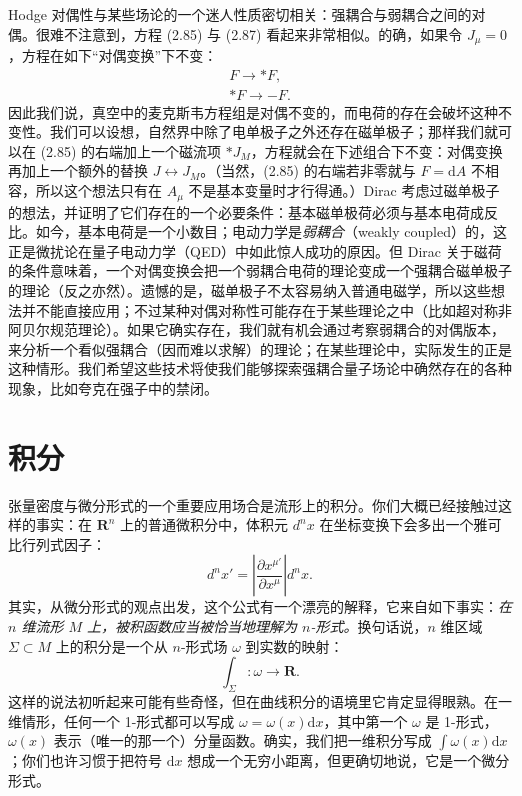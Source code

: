 Hodge 对偶性与某些场论的一个迷人性质密切相关：强耦合与弱耦合之间的对偶。很难不注意到，方程 (2.85) 与 (2.87) 看起来非常相似。的确，如果令 $J_{\mu}=0$，方程在如下“对偶变换”下不变：
\begin{gather*}
F\to *F,\\
*F\to -F. \tag{2.88}
\end{gather*}
因此我们说，真空中的麦克斯韦方程组是对偶不变的，而电荷的存在会破坏这种不变性。我们可以设想，自然界中除了电单极子之外还存在磁单极子；那样我们就可以在 (2.85) 的右端加上一个磁流项 $*J_{M}$，方程就会在下述组合下不变：对偶变换再加上一个额外的替换 $J\leftrightarrow J_{M}$。（当然，(2.85) 的右端若非零就与 $F=\mathrm{d}A$ 不相容，所以这个想法只有在 $A_{\mu}$ 不是基本变量时才行得通。）Dirac 考虑过磁单极子的想法，并证明了它们存在的一个必要条件：基本磁单极荷必须与基本电荷成反比。如今，基本电荷是一个小数目；电动力学是\emph{弱耦合}（weakly coupled）的，这正是微扰论在量子电动力学（QED）中如此惊人成功的原因。但 Dirac 关于磁荷的条件意味着，一个对偶变换会把一个弱耦合电荷的理论变成一个强耦合磁单极子的理论（反之亦然）。遗憾的是，磁单极子不太容易纳入普通电磁学，所以这些想法并不能直接应用；不过某种对偶对称性可能存在于某些理论之中（比如超对称非阿贝尔规范理论）。如果它确实存在，我们就有机会通过考察弱耦合的对偶版本，来分析一个看似强耦合（因而难以求解）的理论；在某些理论中，实际发生的正是这种情形。我们希望这些技术将使我们能够探索强耦合量子场论中确然存在的各种现象，比如夸克在强子中的禁闭。
\section{积分}

张量密度与微分形式的一个重要应用场合是流形上的积分。你们大概已经接触过这样的事实：在 $\mathbf{R}^{n}$ 上的普通微积分中，体积元 $d^{n}x$ 在坐标变换下会多出一个雅可比行列式因子：
\begin{equation*}
d^{n}x'=\left|\frac{\partial x^{\mu'}}{\partial x^{\mu}}\right|d^{n}x. \tag{2.89}
\end{equation*}
其实，从微分形式的观点出发，这个公式有一个漂亮的解释，它来自如下事实：\emph{在 $n$ 维流形 $M$ 上，被积函数应当被恰当地理解为 $n$-形式。}换句话说，$n$ 维区域 $\Sigma\subset M$ 上的积分是一个从 $n$-形式场 $\omega$ 到实数的映射：
\begin{equation*}
\int_{\Sigma}:\omega\to\mathbf{R}. \tag{2.90}
\end{equation*}
这样的说法初听起来可能有些奇怪，但在曲线积分的语境里它肯定显得眼熟。在一维情形，任何一个 1-形式都可以写成 $\omega=\omega(x)\mathrm{d}x$，其中第一个 $\omega$ 是 1-形式，$\omega(x)$ 表示（唯一的那一个）分量函数。确实，我们把一维积分写成 $\int\omega(x)\mathrm{d}x$；你们也许习惯于把符号 $\mathrm{d}x$ 想成一个无穷小距离，但更确切地说，它是一个微分形式。

